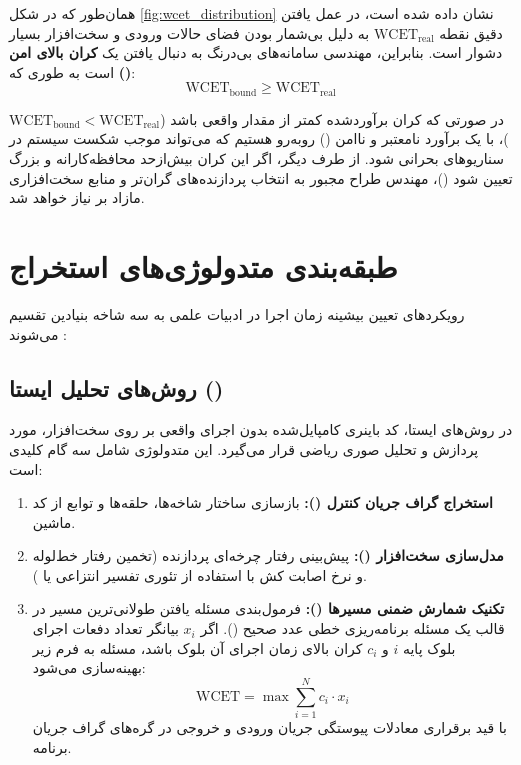 همان‌طور که در شکل \ref{fig:wcet_distribution} نشان داده شده است، در عمل یافتن دقیق نقطه $\mathrm{WCET}_{\mathrm{real}}$ به دلیل بی‌شمار بودن فضای حالات ورودی و سخت‌افزار بسیار دشوار است. بنابراین، مهندسی سامانه‌های بی‌درنگ به دنبال یافتن یک \textbf{کران بالای امن ()} است به طوری که:
\begin{equation}
\mathrm{WCET}_{\mathrm{bound}} \ge \mathrm{WCET}_{\mathrm{real}}
\end{equation}

در صورتی که کران برآوردشده کمتر از مقدار واقعی باشد ($\mathrm{WCET}_{\mathrm{bound}} < \mathrm{WCET}_{\mathrm{real}}$)، با یک برآورد نامعتبر و ناامن () روبه‌رو هستیم که می‌تواند موجب شکست سیستم در سناریوهای بحرانی شود. از طرف دیگر، اگر این کران بیش‌از‌حد محافظه‌کارانه و بزرگ تعیین شود ()، مهندس طراح مجبور به انتخاب پردازنده‌های گران‌تر و منابع سخت‌افزاری مازاد بر نیاز خواهد شد.

\section{طبقه‌بندی متدولوژی‌های استخراج }
رویکردهای تعیین بیشینه زمان اجرا در ادبیات علمی به سه شاخه بنیادین تقسیم می‌شوند \cite{wilhelm2008worst}:

\subsection{روش‌های تحلیل ایستا ()}
در روش‌های ایستا، کد باینری کامپایل‌شده بدون اجرای واقعی بر روی سخت‌افزار، مورد پردازش و تحلیل صوری ریاضی قرار می‌گیرد. این متدولوژی شامل سه گام کلیدی است:
\begin{enumerate}
    \item \textbf{استخراج گراف جریان کنترل ():} بازسازی ساختار شاخه‌ها، حلقه‌ها و توابع از کد ماشین.
    \item \textbf{مدل‌سازی سخت‌افزار ():} پیش‌بینی رفتار چرخه‌ای پردازنده (تخمین رفتار خط‌لوله و نرخ اصابت کش با استفاده از تئوری تفسیر انتزاعی یا ).
    \item \textbf{تکنیک شمارش ضمنی مسیرها ():} فرمول‌بندی مسئله یافتن طولانی‌ترین مسیر در قالب یک مسئله برنامه‌ریزی خطی عدد صحیح (). اگر $x_i$ بیانگر تعداد دفعات اجرای بلوک پایه $i$ و $c_i$ کران بالای زمان اجرای آن بلوک باشد، مسئله به فرم زیر بهینه‌سازی می‌شود:
    \begin{equation}
    \mathrm{WCET} = \max \sum_{i=1}^{N} c_i \cdot x_i
    \end{equation}
    با قید برقراری معادلات پیوستگی جریان ورودی و خروجی در گره‌های گراف جریان برنامه.
\end{enumerate}


